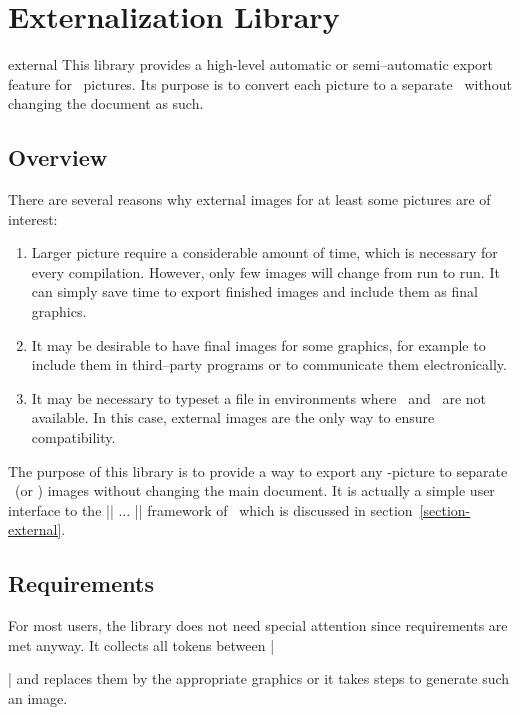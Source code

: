 %
%
%
\section{Externalization Library}
{
\label{section-libs-external}
{}

\begin{tikzlibrary}{external}
	This library provides a high-level automatic or semi--automatic export feature for \tikzname\ pictures.
	Its purpose is to convert each picture to a separate \pdf\ without changing the document as such.
\end{tikzlibrary}

\subsection{Overview}

There are several reasons why external images for at least some pictures are of interest:
\begin{enumerate}
	\item Larger picture require a considerable amount of time, which is necessary for every compilation. However, only few images will change from run to run. It can simply save time to export finished images and include them as final graphics.
	\item It may be desirable to have final images for some graphics, for example to include them in third--party programs or to communicate them electronically.
	\item It may be necessary to typeset a file in environments where \pgfname\ and \tikzname\ are not available. In this case, external images are the only way to ensure compatibility.
\end{enumerate}
The purpose of this library is to provide a way to export any \tikzname-picture to separate \pdf\ (or \eps) images without changing the main document. It is actually a simple user interface to the |\beginpgfgraphicnamed| $\dotsc$ |\endpgfgraphicnamed| framework of \pgfname\ which is discussed in section~\ref{section-external}.

\subsection{Requirements}
For most users, the library does not need special attention since requirements are met anyway. It collects all tokens between || and replaces them by the appropriate graphics or it takes steps to generate such an image.%

}
